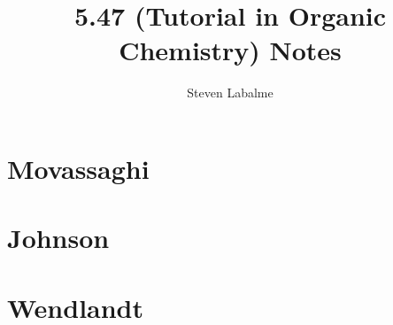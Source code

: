 \documentclass{report}
\title{5.47 (Tutorial in Organic Chemistry) Notes}
\author{Steven Labalme}
\renewcommand{\chaptername}{Problem Set}
\begin{document}
\maketitle



\tableofcontents
\listoffigures
\newpage



\pagestyle{main}
\renewcommand{\chaptermark}[1]{\markboth{\chaptername\ \thechapter\ (#1)}{}}
\part{Movassaghi}






\part{Johnson}


\part{Wendlandt}


\printbibliography[heading=bibintoc]
\end{document}

